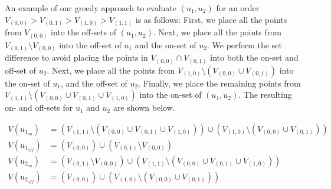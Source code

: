 An example of our greedy approach to evaluate $(u_1,u_2)$ for an order $V_{(0,0)} > V_{(0,1)} > V_{(1,0)} > V_{(1,1)}$ is as follows: First, we place all the points from $V_{(0,0)}$ into the off-sets of $(u_1, u_2)$. Next, we place all the points from $V_{(0,1)} \setminus V_{(0,0)}$ into the off-set of $u_1$ and the on-set of $u_2$. We perform the set difference to avoid placing the points in $V_{(0,0)} \cap V_{(0,1)}$ into both the on-set and off-set of $u_2$. Next, we place all the points from $V_{(1,0)} \setminus (V_{(0,0)} \cup V_{(0,1)})$ into the on-set of $u_1$, and the off-set of $u_2$. Finally, we place the remaining points from $V_{(1,1)} \setminus (V_{(0,0)} \cup V_{(0,1)} \cup V_{(1,0)})$ into the on-set of $(u_1, u_2)$. The resulting on- and off-sets for $u_1$ and $u_2$ are shown below.





\begin{align*}
    V(u_{1_{on}})&= (V_{(1,1)} \setminus (V_{(0,0)} \cup V_{(0,1)} \cup V_{(1,0)})) \cup (V_{(1,0)} \setminus (V_{(0,0)} \cup V_{(0,1)}))\\
    V(u_{1_{off}}) &= (V_{(0,0)}) \cup (V_{(0,1)} \setminus V_{(0,0)}) \\
    V(u_{2_{on}})&= (V_{(0,1)} \setminus V_{(0,0)}) \cup (V_{(1,1)} \setminus (V_{(0,0)} \cup V_{(0,1)} \cup V_{(1,0)}))\\
    V(u_{2_{off}}) &= (V_{(0,0)}) \cup (V_{(1,0)} \setminus (V_{(0,0)} \cup V_{(0,1)}))
\end{align*}

